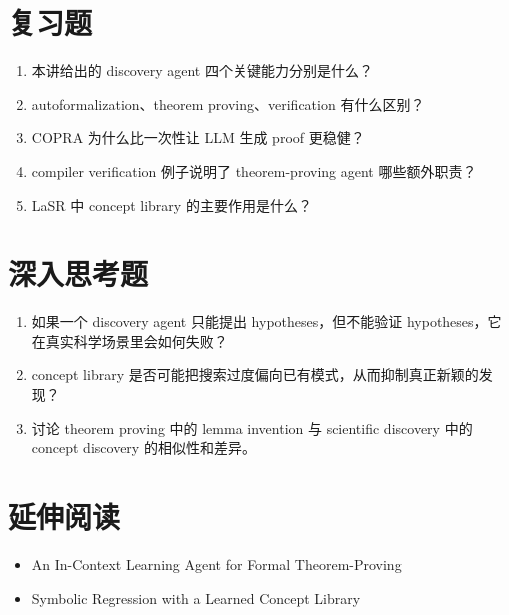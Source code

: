 \section{复习题}
\begin{enumerate}
\item 本讲给出的 discovery agent 四个关键能力分别是什么？
\item autoformalization、theorem proving、verification 有什么区别？
\item COPRA 为什么比一次性让 LLM 生成 proof 更稳健？
\item compiler verification 例子说明了 theorem-proving agent 哪些额外职责？
\item LaSR 中 concept library 的主要作用是什么？
\end{enumerate}

\section{深入思考题}
\begin{enumerate}
\item 如果一个 discovery agent 只能提出 hypotheses，但不能验证 hypotheses，它在真实科学场景里会如何失败？
\item concept library 是否可能把搜索过度偏向已有模式，从而抑制真正新颖的发现？
\item 讨论 theorem proving 中的 lemma invention 与 scientific discovery 中的 concept discovery 的相似性和差异。
\end{enumerate}

\section{延伸阅读}
\begin{itemize}
\item An In-Context Learning Agent for Formal Theorem-Proving
\item Symbolic Regression with a Learned Concept Library
\end{itemize}
